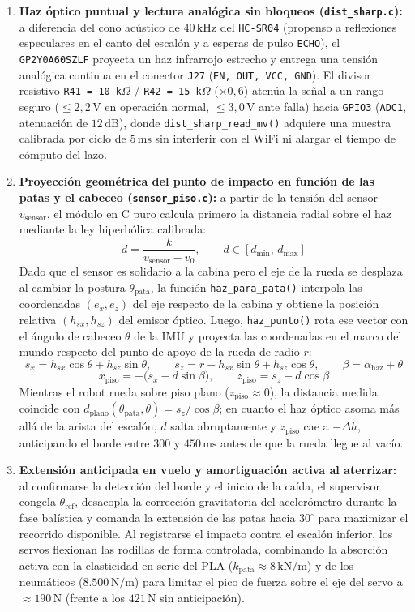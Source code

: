\documentclass[11pt,a4paper]{report}
\newcommand{\ud}[1]{\,\mathrm{#1}}
\begin{document}
\begin{enumerate}[leftmargin=1.6em]
\item \textbf{Haz óptico puntual y lectura analógica sin bloqueos (\texttt{dist\_sharp.c}):} a diferencia del cono acústico de $40\ud{kHz}$ del \texttt{HC-SR04} (propenso a reflexiones especulares en el canto del escalón y a esperas de pulso \texttt{ECHO}), el \texttt{GP2Y0A60SZLF} proyecta un haz infrarrojo estrecho y entrega una tensión analógica continua en el conector \texttt{J27} (\texttt{EN, OUT, VCC, GND}). El divisor resistivo \texttt{R41 = 10 k$\Omega$} / \texttt{R42 = 15 k$\Omega$} ($\times 0{,}6$) atenúa la señal a un rango seguro ($\le 2{,}2\ud{V}$ en operación normal, $\le 3{,}0\ud{V}$ ante falla) hacia \texttt{GPIO3} (\texttt{ADC1}, atenuación de $12\ud{dB}$), donde \texttt{dist\_sharp\_read\_mv()} adquiere una muestra calibrada por ciclo de $5\ud{ms}$ sin interferir con el WiFi ni alargar el tiempo de cómputo del lazo.
\item \textbf{Proyección geométrica del punto de impacto en función de las patas y el cabeceo (\texttt{sensor\_piso.c}):} a partir de la tensión del sensor $v_{\text{sensor}}$, el módulo en C puro calcula primero la distancia radial sobre el haz mediante la ley hiperbólica calibrada:
      \[
      d = \frac{k}{v_{\text{sensor}} - v_0}, \qquad d \in [d_{\min},\, d_{\max}]
      \]
      Dado que el sensor es solidario a la cabina pero el eje de la rueda se desplaza al cambiar la postura $\theta_{\text{pata}}$, la función \texttt{haz\_para\_pata()} interpola las coordenadas $(e_x, e_z)$ del eje respecto de la cabina y obtiene la posición relativa $(h_{sx}, h_{sz})$ del emisor óptico. Luego, \texttt{haz\_punto()} rota ese vector con el ángulo de cabeceo $\theta$ de la IMU y proyecta las coordenadas en el marco del mundo respecto del punto de apoyo de la rueda de radio $r$:
      \[
      s_x = h_{sx}\cos\theta + h_{sz}\sin\theta, \qquad s_z = r - h_{sx}\sin\theta + h_{sz}\cos\theta, \qquad \beta = \alpha_{\text{haz}} + \theta
      \]
      \[
      x_{\text{piso}} = -\bigl(s_x - d\sin\beta\bigr), \qquad z_{\text{piso}} = s_z - d\cos\beta
      \]
      Mientras el robot rueda sobre piso plano ($z_{\text{piso}} \approx 0$), la distancia medida coincide con $d_{\text{plano}}(\theta_{\text{pata}}, \theta) = s_z / \cos\beta$; en cuanto el haz óptico asoma más allá de la arista del escalón, $d$ salta abruptamente y $z_{\text{piso}}$ cae a $-\Delta h$, anticipando el borde entre $300$ y $450\ud{ms}$ antes de que la rueda llegue al vacío.
\item \textbf{Extensión anticipada en vuelo y amortiguación activa al aterrizar:} al confirmarse la detección del borde y el inicio de la caída, el supervisor congela $\theta_{\text{ref}}$, desacopla la corrección gravitatoria del acelerómetro durante la fase balística y comanda la extensión de las patas hacia $30^\circ$ para maximizar el recorrido disponible. Al registrarse el impacto contra el escalón inferior, los servos flexionan las rodillas de forma controlada, combinando la absorción activa con la elasticidad en serie del PLA ($k_{\text{pata}} \approx 8\ud{kN/m}$) y de los neumáticos ($8.500\ud{N/m}$) para limitar el pico de fuerza sobre el eje del servo a $\approx 190\ud{N}$ (frente a los $421\ud{N}$ sin anticipación).

\end{enumerate}
\end{document}
